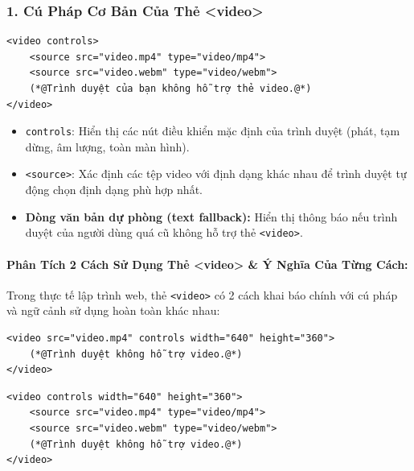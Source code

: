 \documentclass[11pt,oneside]{book}
\newcommand{\codeinline}[1]{\textcolor{accentOrange}{\texttt{#1}}}
\begin{document}
\subsubsection{1. Cú Pháp Cơ Bản Của Thẻ <video>}

\begin{codeWindow}
\begin{lstlisting}[language=HTML5]
<video controls>
    <source src="video.mp4" type="video/mp4">
    <source src="video.webm" type="video/webm">
    (*@Trình duyệt của bạn không hỗ trợ thẻ video.@*)
</video>
\end{lstlisting}
\end{codeWindow}

\begin{itemize}[leftmargin=1.5em, itemsep=2pt, parsep=0pt]
    \item \codeinline{controls}: Hiển thị các nút điều khiển mặc định của trình duyệt (phát, tạm dừng, âm lượng, toàn màn hình).
    \item \codeinline{<source>}: Xác định các tệp video với định dạng khác nhau để trình duyệt tự động chọn định dạng phù hợp nhất.
    \item \textbf{Dòng văn bản dự phòng (text fallback):} Hiển thị thông báo nếu trình duyệt của người dùng quá cũ không hỗ trợ thẻ \codeinline{<video>}.
\end{itemize}

\paragraph{Phân Tích 2 Cách Sử Dụng Thẻ <video> \& Ý Nghĩa Của Từng Cách:}

Trong thực tế lập trình web, thẻ \codeinline{<video>} có 2 cách khai báo chính với cú pháp và ngữ cảnh sử dụng hoàn toàn khác nhau:

\begin{codeWindow}
\begin{lstlisting}[language=HTML5]
<video src="video.mp4" controls width="640" height="360">
    (*@Trình duyệt không hỗ trợ video.@*)
</video>
\end{lstlisting}
\end{codeWindow}

\begin{codeWindow}
\begin{lstlisting}[language=HTML5]
<video controls width="640" height="360">
    <source src="video.mp4" type="video/mp4">
    <source src="video.webm" type="video/webm">
    (*@Trình duyệt không hỗ trợ video.@*)
</video>
\end{lstlisting}
\end{codeWindow}
\end{document}
